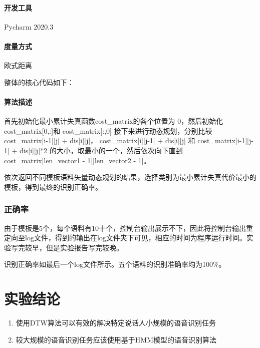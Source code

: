 \documentclass{hitreport}
\begin{document}
\paragraph{开发工具} Pycharm 2020.3
\paragraph{度量方式} 欧式距离

整体的核心代码如下：


\paragraph{算法描述}首先初始化最小累计失真函数cost\_matrix的各个位置为 0，然后初始化 cost\_matrix[0,:]和 cost\_matrix[:,0]
接下来进行动态规划，分别比较 cost\_matrix[i-1][j] + dis[i][j]， cost\_matrix[i][j-1] + dis[i][j] 和
cost\_matrix[i-1][j-1] + dis[i][j]*2 的大小，取最小的一个，然后依次向下直到cost\_matrix[len\_vector1 - 1][len\_vector2 - 1]。

依次返回不同模板语料矢量动态规划的结果，选择类别为最小累计失真代价最小的模板，得到最终的识别正确率。

\subsubsection{正确率}

由于模板是5个，每个语料有10十个，控制台输出展示不下，因此将控制台输出重定向至log文件，得到的输出在log文件夹下可见，相应的时间为程序运行时间。实验写完较早，但是实验报告写完较晚。

识别正确率如最后一个log文件所示。五个语料的识别准确率均为100\%。


\section{实验结论}

\begin{enumerate}
\item 使用DTW算法可以有效的解决特定说话人小规模的语音识别任务
\item 较大规模的语音识别任务应该使用基于HMM模型的语音识别算法
\end{enumerate}

 
\renewcommand\refname{参考文献}
 
 
\end{document}
